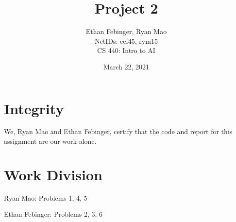 \documentclass[12pt, twoside]{article}
\newcommand{\name}{Ethan Febinger, Ryan Mao \\ NetIDs: eef45, rym15}
\newcommand{\class}{CS 440: Intro to AI}
\newcommand{\hwTitle}{Project 2} %
\newcommand{\due}{March 22, 2021} %
\begin{document}
 
 
\title{\hwTitle} %
\author{\name\\  %
\class} %
\date{\due}
 
\maketitle

\section*{Integrity}

We, Ryan Mao and Ethan Febinger, certify that the code and report for this assignment are our work alone.

\section*{Work Division}

    Ryan Mao: Problems 1, 4, 5 

    \noindent Ethan Febinger: Problems 2, 3, 6


\tableofcontents
\vfill
\pagebreak
\end{document}
